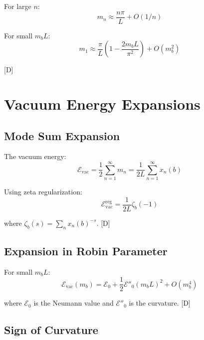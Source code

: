 \documentclass[11pt,a4paper]{article}
\newcommand{\tagD}{\textcolor{blue!70!black}{[D]}}
\begin{document}
For large $n$:
\begin{equation}
\label{eq:spec-asymp}
m_n \approx \frac{n\pi}{L} + O(1/n)
\end{equation}

For small $m_b L$:
\begin{equation}
\label{eq:spec-small-mb}
m_1 \approx \frac{\pi}{L}\left(1 - \frac{2m_b L}{\pi^2}\right) + O(m_b^2)
\end{equation}

\tagD

\section{Vacuum Energy Expansions}

\subsection{Mode Sum Expansion}

The vacuum energy:
\begin{equation}
\label{eq:vac-mode}
\mathcal{E}_{\text{vac}} = \frac{1}{2} \sum_{n=1}^{\infty} m_n = \frac{1}{2L} \sum_{n=1}^{\infty} x_n(b)
\end{equation}

Using zeta regularization:
\begin{equation}
\label{eq:vac-zeta}
\mathcal{E}_{\text{vac}}^{\text{reg}} = \frac{1}{2L} \zeta_b(-1)
\end{equation}

where $\zeta_b(s) = \sum_n x_n(b)^{-s}$. \tagD

\subsection{Expansion in Robin Parameter}

For small $m_b L$:
\begin{equation}
\label{eq:vac-expand}
\mathcal{E}_{\text{vac}}(m_b) = \mathcal{E}_0 + \frac{1}{2} \mathcal{E}''_0 (m_b L)^2 + O(m_b^4)
\end{equation}

where $\mathcal{E}_0$ is the Neumann value and $\mathcal{E}''_0$ is the curvature. \tagD

\subsection{Sign of Curvature}
\end{document}
